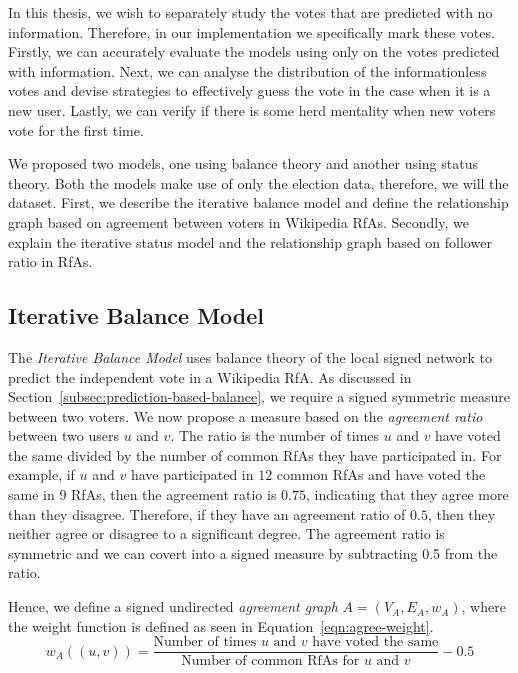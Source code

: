 In this thesis, we wish to separately study the votes that are predicted with no information.
Therefore, in our implementation we specifically mark these votes.
Firstly, we can accurately evaluate the models using only on the votes predicted with information.
Next, we can analyse the distribution of the informationless votes and devise strategies to effectively guess the vote in the case when it is a new user.
Lastly, we can verify if there is some herd mentality when new voters vote for the first time.

We proposed two models, one using balance theory and another using status theory.
Both the models make use of only the election data, therefore, we will the \wikirfa dataset.
First, we describe the iterative balance model and define the relationship graph based on agreement between voters in Wikipedia RfAs.
Secondly, we explain the iterative status model and the relationship graph based on follower ratio in RfAs.

\subsection{Iterative Balance Model}
The \textit{Iterative Balance Model}  uses balance theory of the local signed network to predict the independent vote in a Wikipedia RfA.
As discussed in Section~\ref{subsec:prediction-based-balance}, we require a signed symmetric measure between two voters.
We now propose a measure based on the \textit{agreement ratio} between two users $u$ and $v$.
The ratio is the number of times $u$ and $v$ have voted the same divided by the number of common RfAs they have participated in.
For example, if $u$ and $v$ have participated in $12$ common RfAs and have voted the same in $9$ RfAs, then the agreement ratio is $0.75$, indicating that they agree more than they disagree.
Therefore, if they have an agreement ratio of $0.5$, then they neither agree or disagree to a significant degree.
The agreement ratio is symmetric and we can covert into a signed measure by subtracting 0.5 from the ratio.

Hence, we define a signed undirected \textit{agreement graph} $A= (V_{A},E_{A},w_{A})$, where the weight function is defined as seen in Equation~\eqref{eqn:agree-weight}.
\begin{equation}
    \label{eqn:agree-weight}
    w_{A}((u,v)) = \frac{\text{Number of times } u \text{ and } v \text{ have voted the same}}{\text{Number of common RfAs for } u \text{ and } v} -0.5
\end{equation}

